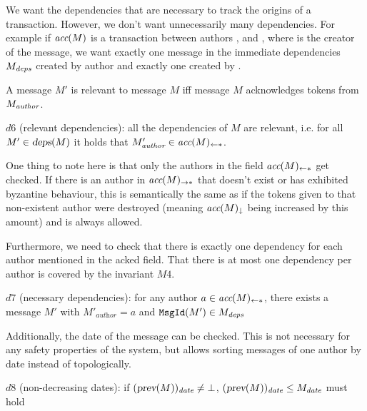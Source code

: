 \documentclass{article}
\begin{document}
We want the dependencies that are necessary to track the origins of a transaction. However, we don't want unnecessarily many dependencies. For example if $\textit{acc}(M)$ is a transaction between authors ,  and , where  is the creator of the message, we want exactly one message in the immediate dependencies $M_\emph{deps}$ created by author  and exactly one created by .

A message $M'$ is relevant to message $M$ iff message $M$ acknowledges tokens from $M_\emph{author}$.
\begin{invariant}{$d6$}
    (relevant dependencies): all the dependencies of $M$ are relevant, i.e. for all $M' \in \textsl{deps}(M)$ it holds that $M'_\textit{author} \in \textit{acc}(M)_{\leftarrow *}$.
\end{invariant}
One thing to note here is that only the authors in the field $\textit{acc}(M)_{\leftarrow *}$ get checked. If there is an author in $\textit{acc}(M)_{\rightarrow *}$ that doesn't exist or has exhibited byzantine behaviour, this is semantically the same as if the tokens given to that non-existent author were destroyed (meaning $\textit{acc}(M)_\downarrow$ being increased by this amount) and is always allowed.

Furthermore, we need to check that there is exactly one dependency for each author mentioned in the acked field. That there is at most one dependency per author is covered by the invariant $M4$.
\begin{invariant}{$d7$}
    (necessary dependencies): for any author $a \in \textit{acc}(M)_{\leftarrow *}$, there exists a message $M'$ with $M'_\textit{author} = a$ and $\texttt{MsgId}(M') \in M_\textit{deps}$
\end{invariant}

Additionally, the date of the message can be checked. This is not necessary for any safety properties of the system, but allows sorting messages of one author by date instead of topologically.
\begin{invariant}{$d8$}
    (non-decreasing dates): if $(\textsl{prev}(M))_\textit{date} \ne \bot$, $(\textsl{prev}(M))_\textit{date} \leq M_\textit{date}$ must hold
\end{invariant}
\end{document}
